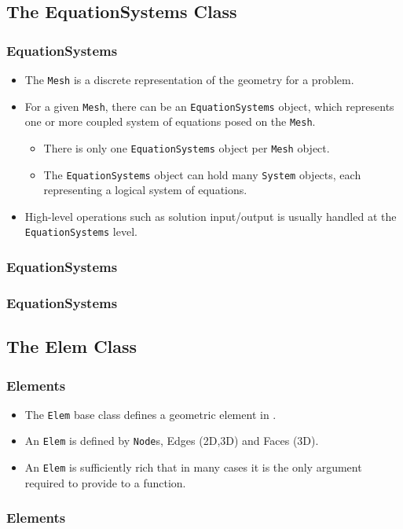 \subsection{The EquationSystems Class}
\begin{frame}
  \frametitle{EquationSystems}
  \begin{block}{}
    \begin{itemize}
      \item The \texttt{Mesh} is a discrete representation of the geometry for a problem.
      \item For a given \texttt{Mesh}, there can be an \texttt{EquationSystems} object, which represents one or more coupled system of equations posed on the \texttt{Mesh}.
        \begin{itemize}
          \item There is only one \texttt{EquationSystems} object per \texttt{Mesh} object.
          \item The \texttt{EquationSystems} object can hold many \texttt{System} objects, each representing a logical system of equations.
        \end{itemize}
      \item High-level operations such as solution input/output is usually handled at the \texttt{EquationSystems} level.
    \end{itemize}
  \end{block}
\end{frame}

\begin{frame}[shrink]
  \frametitle{EquationSystems}
  
\end{frame}

\begin{frame}[shrink]
  \frametitle{EquationSystems}
  
\end{frame}




\subsection{The Elem Class}
\begin{frame}
  \frametitle{Elements}
  \begin{block}{}
    \begin{itemize}
      \item The \texttt{Elem} base class defines a geometric element in \libMesh{}.
      \item An \texttt{Elem} is defined by \texttt{Node}s, Edges (2D,3D) and Faces (3D).
      \item An \texttt{Elem} is sufficiently rich that in many cases it is the only argument required to provide to a function.
    \end{itemize}
  \end{block}
\end{frame}

\begin{frame}[shrink]
  \frametitle{Elements}
  
\end{frame}
